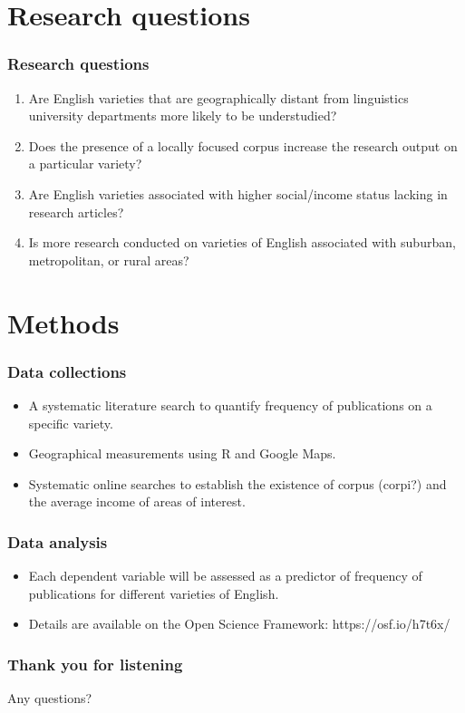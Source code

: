 \documentclass{beamer}
\begin{document}
\section{Research questions}
\begin{frame}
\frametitle{Research questions}
\begin{enumerate} 
		\item Are English varieties that are geographically distant from linguistics university departments more likely to be understudied? \label{geog}
		
		\item Does the presence of a locally focused corpus increase the research output on a particular variety?  \label{corpus}
		
		\item Are English varieties associated with higher social/income status lacking in research articles? \label{income}
		
		\item Is more research conducted on varieties of English associated with suburban, metropolitan, or rural areas? \label{suburban}
	\end{enumerate}
\end{frame}


\section{Methods}
\begin{frame}
\frametitle{Data collections}
\begin{itemize}
\item A systematic literature search to quantify frequency of publications on a specific variety.
\item Geographical measurements using R and Google Maps.
\item Systematic online searches to establish the existence of corpus (corpi?) and the average income of areas of interest.
\end{itemize}
\end{frame}

\begin{frame}
\frametitle{Data analysis}
\begin{itemize}
\item Each dependent variable will be assessed as a predictor of frequency of publications for different varieties of English.
\item Details are available on the Open Science Framework: https://osf.io/h7t6x/
\end{itemize}
\end{frame}

\begin{frame}
\frametitle{Thank you for listening}
Any questions?
\end{frame}
\end{document}
